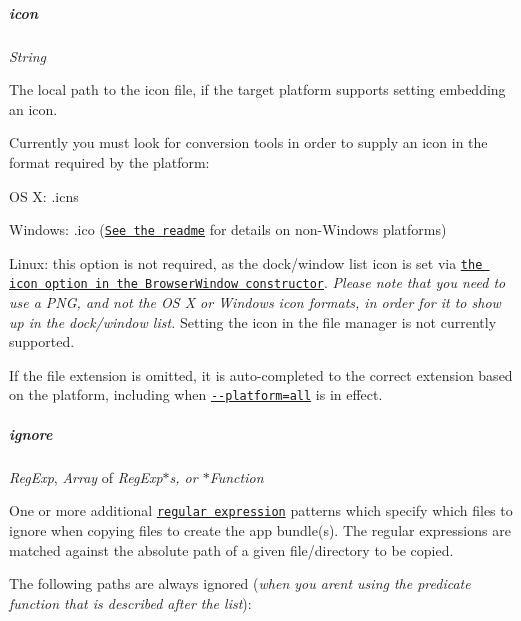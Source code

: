 \subparagraph*{{\ttfamily icon}}

{\itshape String}

The local path to the icon file, if the target platform supports setting embedding an icon.

Currently you must look for conversion tools in order to supply an icon in the format required by the platform\+:


\begin{DoxyItemize}
\item OS X\+: {\ttfamily .icns}
\item Windows\+: {\ttfamily .ico} (\href{https://github.com/electron-userland/electron-packager#building-windows-apps-from-non-windows-platforms}{\tt See the readme} for details on non-\/\+Windows platforms)
\item Linux\+: this option is not required, as the dock/window list icon is set via \href{http://electron.atom.io/docs/api/browser-window/#new-browserwindowoptions}{\tt the {\ttfamily icon} option in the {\ttfamily Browser\+Window} constructor}. {\itshape Please note that you need to use a P\+NG, and not the OS X or Windows icon formats, in order for it to show up in the dock/window list.} Setting the icon in the file manager is not currently supported.
\end{DoxyItemize}

If the file extension is omitted, it is auto-\/completed to the correct extension based on the platform, including when \href{#platform}{\tt {\ttfamily -\/-\/platform=all}} is in effect.

\subparagraph*{{\ttfamily ignore}}

{\itshape Reg\+Exp}, {\itshape Array} of {\itshape Reg\+Exp$\ast$s, or $\ast$\+Function}

One or more additional \href{https://developer.mozilla.org/en-US/docs/Web/JavaScript/Guide/Regular_Expressions}{\tt regular expression} patterns which specify which files to ignore when copying files to create the app bundle(s). The regular expressions are matched against the absolute path of a given file/directory to be copied.

The following paths are always ignored ({\itshape when you aren\textquotesingle{}t using the predicate function that is described after the list})\+:


